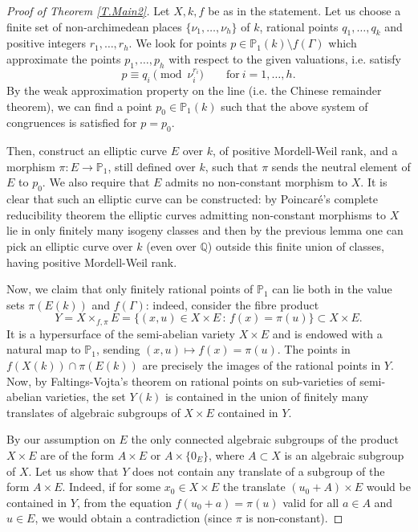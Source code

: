 \documentclass[leqno,12pt]{article} %
\def\Q{{{\mathbb Q}}}
\def\P{{{\mathbb P}}}
\theoremstyle{plain} %
\theoremstyle{definition} %
\begin{document}
\begin{proof}[ Proof of Theorem \ref{T.Main2}] 

Let $X,k,f$ be as in the statement. Let us choose a finite set of non-archimedean places $\{\nu_1,\ldots,\nu_h\}$ of $k$, rational points $q_1,\ldots,q_k$ and positive integers  $r_1,\ldots,r_h$. We look for points $p \in \P_1(k)\setminus f(\Gamma)$ which  approximate   the points $p_1,\ldots,p_h$ with respect to the given valuations, i.e. satisfy
\begin{equation}\label{E.approximation}
p\equiv q_i \pmod {\nu_i^{r_i}} \qquad \mathrm{for} \ i=1,\ldots,h.
\end{equation} 
By the weak approximation property on the line (i.e. the Chinese remainder theorem), we can find a point $p_0\in \P_1(k)$ such that the above system of congruences is satisfied for $p=p_0$.

Then, construct an elliptic curve $E$ over $k$, of positive Mordell-Weil rank, and a morphism $\pi:E\to \P_1$, still defined over $k$, such that $\pi$ sends the neutral element of $E$ to $p_0$. We also require that $E$ admits no non-constant morphism to $X$. 
It is clear that such an elliptic curve can be constructed: by Poincar\'e's complete reducibility theorem   the elliptic curves admitting non-constant morphisms to $X$ lie in only finitely many isogeny classes and then by the previous lemma one can pick an elliptic curve over $k$ (even over $\Q$) outside this finite union of classes, having positive Mordell-Weil rank. 

Now, we claim that only finitely rational points of $\P_1$ can lie both in the value sets   $\pi(E(k))$ and $f(\Gamma)$: indeed, consider the fibre product 
$$
Y=X\times_{f,\pi} E=\{(x,u)\in X\times E\, :\, f(x)=\pi(u)\}\subset X\times E.
$$
It is a hypersurface of the semi-abelian variety $X\times E$ and is endowed with a natural map to $\P_1$, sending $(x,u)\mapsto f(x)=\pi(u)$. The points in $f(X(k))\cap \pi(E(k))$ are precisely the images of the rational points in $Y$. Now, by Faltings-Vojta's theorem on rational points on sub-varieties of semi-abelian varieties, the set $Y(k)$ is contained in the union of finitely many translates of algebraic subgroups of $X\times E$ contained in $Y$.

By our assumption on $E$ the only connected algebraic subgroups of the product $X\times E$ are of the form  $A\times E$ or $A\times\{0_E\}$,  where $A\subset X$ is an algebraic subgroup of $X$. Let us show that  $Y$ does not contain any translate of a  subgroup of the form $A\times E$. Indeed,   if for some $x_0 \in X\times E$ the translate $(u_0+A)\times E$  would be contained in $Y$, from the equation $f(u_0+a)=\pi(u)$ valid for all $a\in A$ and $u\in E$, we would obtain a contradiction (since $\pi$ is non-constant).


\end{proof}
\end{document}
